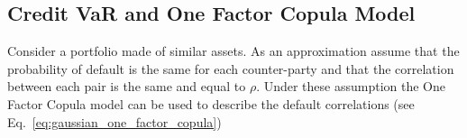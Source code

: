 %    
%
%
%
%
%
%
%  
%

\subsection{Credit VaR and One Factor Copula Model}
Consider a portfolio made of similar assets. As an approximation assume that the probability of default is the same for each counter-party and that the correlation between each pair is the same and equal to $\rho$. Under these assumption the One Factor Copula model can be used to describe the default correlations (see Eq.~\ref{eq:gaussian_one_factor_copula})

